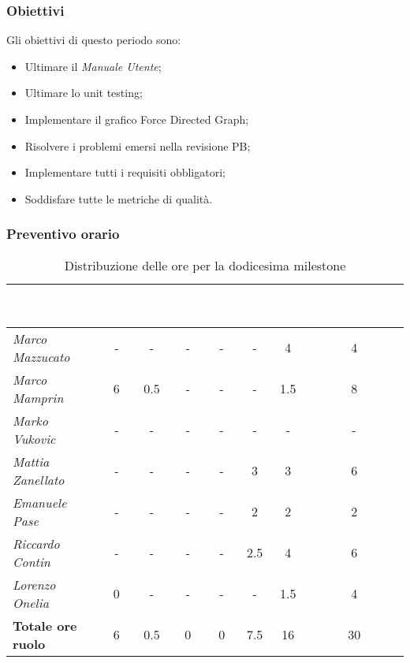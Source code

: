 \subsubsection{Obiettivi}
Gli obiettivi di questo periodo sono:
\begin{itemize}
    \item Ultimare il \textit{Manuale Utente};
    \item Ultimare lo unit testing;
    \item Implementare il grafico Force Directed Graph;
    \item Risolvere i problemi emersi nella revisione PB;
    \item Implementare tutti i requisiti obbligatori;
    \item Soddisfare tutte le metriche di qualità.

\end{itemize}

\subsubsection{Preventivo orario}

\begin{table}[H]
    \renewcommand\arraystretch{1.5}
    \centering
    \begin{tabular}{|l|c|c|c|c|c|c|c|}
    \hline
    \rowcolor[HTML]{036400}
    \textcolor{white}{\textbf{Membro}} & \multicolumn{1}{l|}{\textcolor{white}{\textbf{RE}}} & \multicolumn{1}{l|}{\textcolor{white}{\textbf{AM}}} & \multicolumn{1}{l|}{\textcolor{white}{\textbf{AN}}} & \multicolumn{1}{l|}{\textcolor{white}{\textbf{PT}}} & \multicolumn{1}{l|}{\textcolor{white}{\textbf{PR}}} & \multicolumn{1}{l|}{\textcolor{white}{\textbf{VE}}} & \multicolumn{1}{l|}{\textcolor{white}{\textbf{Totale ore persona}}} \\ \hline
    \rowcolor[HTML]{EFEFEF}\textit{Marco Mazzucato}  & -   & -   & -  & -    & -    & 4      & 4     \\ \hline
    \rowcolor[HTML]{C0C0C0}\textit{Marco Mamprin}    & 6   & 0.5 & -  & -    & -    & 1.5    & 8     \\ \hline
    \rowcolor[HTML]{EFEFEF}\textit{Marko Vukovic}    & -   & -   & -  & -    & -    & -      & -     \\ \hline
    \rowcolor[HTML]{C0C0C0}\textit{Mattia Zanellato} & -   & -   & -  & -    & 3    & 3      & 6     \\ \hline
    \rowcolor[HTML]{EFEFEF}\textit{Emanuele Pase}    & -   & -   & -  & -    & 2    & 2      & 2     \\ \hline
    \rowcolor[HTML]{C0C0C0}\textit{Riccardo Contin}  & -   & -   & -  & -    & 2.5  & 4      & 6     \\ \hline
    \rowcolor[HTML]{EFEFEF}\textit{Lorenzo Onelia}   & 0   & -   & -  & -    & -    & 1.5    & 4     \\ \hline
    \rowcolor[HTML]{C0C0C0}\textbf{Totale ore ruolo} & 6   & 0.5 & 0  & 0    & 7.5  & 16     & 30    \\ \hline
    \end{tabular}
    \caption{Distribuzione delle ore per la dodicesima milestone}
\end{table}

